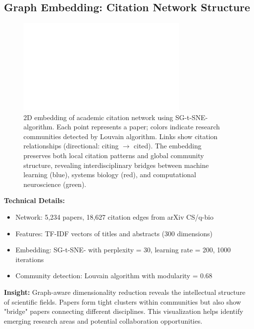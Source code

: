 
\subsection*{Graph Embedding: Citation Network Structure}

\begin{figure}[h]
\centering
\includegraphics[width=0.75\textwidth]{assets/placeholder_1600x900.png}
\caption{2D embedding of academic citation network using SG-t-SNE-\textPi{} algorithm. Each point represents a paper; colors indicate research communities detected by Louvain algorithm. Links show citation relationships (directional: citing $\to$ cited). The embedding preserves both local citation patterns and global community structure, revealing interdisciplinary bridges between machine learning (blue), systems biology (red), and computational neuroscience (green).}
\end{figure}

\textbf{Technical Details:}
\begin{itemize}[leftmargin=1.2em, itemsep=0.1em]
  \item Network: 5,234 papers, 18,627 citation edges from arXiv CS/q-bio
  \item Features: TF-IDF vectors of titles and abstracts (300 dimensions)
  \item Embedding: SG-t-SNE-\textPi{} with perplexity = 30, learning rate = 200, 1000 iterations
  \item Community detection: Louvain algorithm with modularity = 0.68
\end{itemize}

\textbf{Insight:} Graph-aware dimensionality reduction reveals the intellectual structure of scientific fields. Papers form tight clusters within communities but also show "bridge" papers connecting different disciplines. This visualization helps identify emerging research areas and potential collaboration opportunities.


